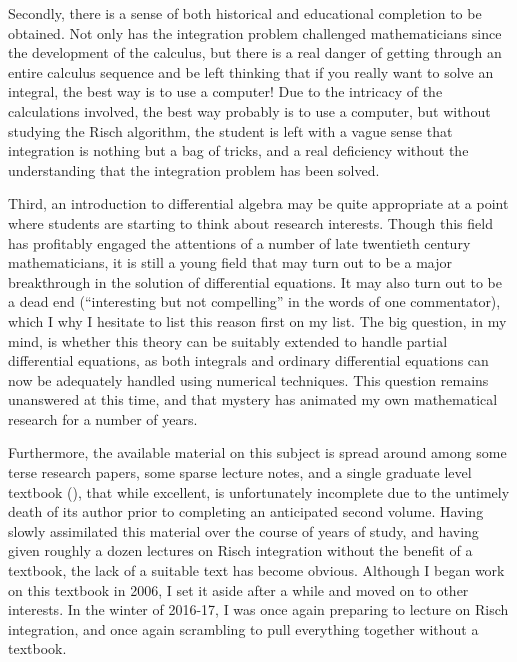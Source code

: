 Secondly, there is a sense of both historical and educational
completion to be obtained.  Not only has the integration problem
challenged mathematicians since the development of the calculus, but
there is a real danger of getting through an entire calculus sequence
and be left thinking that if you really want to solve an integral, the
best way is to use a computer!  Due to the intricacy of the
calculations involved, the best way probably is to use a computer, but
without studying the Risch algorithm, the student is left with a vague
sense that integration is nothing but a bag of tricks, and
a real deficiency without
the understanding that the integration problem has been solved.

Third, an introduction to differential algebra may be quite
appropriate at a point where students are starting to think about
research interests.  Though this field has profitably engaged the
attentions of a number of late twentieth century mathematicians, it is
still a young field that may turn out to be a major breakthrough in
the solution of differential equations.  It may also turn out to be a
dead end (``interesting but not compelling'' in the words of one
commentator), which I why I hesitate to list this reason first on my
list.  The big question, in my mind, is whether this theory can be
suitably extended to handle partial differential equations, as both
integrals and ordinary differential equations can now be adequately
handled using numerical techniques.  This question remains unanswered
at this time, and that mystery has animated my own mathematical
research for a number of years.


Furthermore, the available material on this subject is spread around
among some terse research papers, some sparse lecture notes, and a
single graduate level textbook (\cite{bronstein book}), that while
excellent, is unfortunately incomplete due to the untimely death of
its author prior to completing an anticipated second volume.
Having
slowly assimilated this material over the course of years of study,
and having given roughly a dozen lectures on Risch integration
without the benefit of a textbook, the lack of a suitable text
has become obvious.  Although I began work on this textbook
in 2006, I set it aside after a while and moved on to other
interests.
In the winter of 2016-17, I was once again
preparing to lecture on Risch integration, and once again
scrambling to pull everything together without a textbook.

